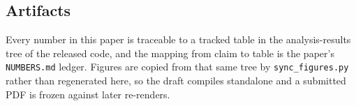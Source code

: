 \subsection{Artifacts}

Every number in this paper is traceable to a tracked table in the analysis-results tree of the
released code, and the mapping from claim to table is the paper's \texttt{NUMBERS.md} ledger. Figures are copied from that same tree by \texttt{sync\_figures.py}
rather than regenerated here, so the draft compiles standalone and a submitted PDF is frozen
against later re-renders.
